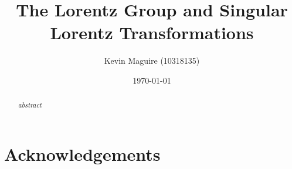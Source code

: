 \documentclass[floatfix,aps,prd,amsmath,amssymb]{revtex4}
\begin{document}
\title{The Lorentz Group and Singular Lorentz Transformations}
\author{Kevin Maguire (10318135)}
\date{\today}

\begin{abstract}
\textit{abstract}
\end{abstract}

\maketitle
{}


\newpage

\tableofcontents
{}

\newpage
 







 




\section{Acknowledgements}
 
\begin{thebibliography}{10}
\end{thebibliography}
\end{document}
